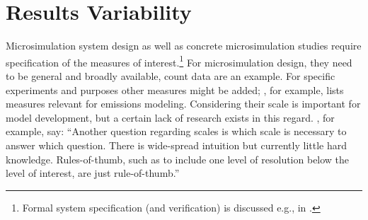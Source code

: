 \vfill\eject
\section{Results Variability}
\label{sec:variability}
Microsimulation system design as well as concrete microsimulation studies require specification of the measures  of interest.\footnote{%
Formal system specification (and verification) is discussed e.g., in \citet[][]{FisherWooldridge_IJCIS_1997, BourahlaBenmohamed_ENTCS_2005}. 
} For microsimulation design, they need to be general and broadly available, count data are an example. For specific experiments and purposes other measures might be added; \citet[][]{Kitamura_TMIP_1996}, for example, lists measures relevant for emissions modeling. Considering their scale is important for model development, but a certain lack of research exists in this regard. \citet[][Section 2.2]{NagelAxhausen_TechRep_IVT_2001}, for example, say: ``Another question regarding scales is which scale is necessary to answer which question. There is wide-spread intuition but currently little hard knowledge. Rules-of-thumb, such as to include one level of resolution below the level of interest, are just rule-of-thumb.'' 

